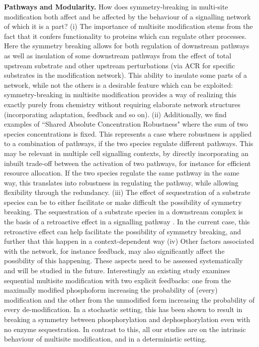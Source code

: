 \documentclass[9pt,lineno]{elife}
\begin{document}
{\bf Pathways and Modularity.} How does symmetry-breaking in multi-site modification both affect and be affected by the behaviour of a signalling network of which it is a part? (i) The importance of multisite modification stems from the fact that it confers functionality to proteins which can regulate other processes. Here the symmetry breaking allows for both regulation of downstream pathways as well as insulation of some downstream pathways from the effect of total upstream substrate and other upstream perturbations (via ACR for specific substrates in the modification network). This ability to insulate some parts of a network, while not the others is a desirable feature which can be exploited: symmetry-breaking in multisite modification provides a way of realizing this exactly purely from chemistry without requiring elaborate network structures (incorporating adaptation, feedback and so on). 
(ii) Additionally, we find examples of ``Shared Absolute Concentration Robustness" where the sum of two species concentrations is fixed. This represents a case where robustness is applied to a combination of pathways, if the two species regulate different pathways. This may be relevant in multiple cell signalling contexts, by directly incorporating an inbuilt trade-off between the activation of two pathways, for instance for efficient resource allocation. If the two species regulate the same pathway in the same way, this translates into robustness in regulating the pathway, while allowing flexibility through the redundancy. 
(iii) The effect of sequestration of a substrate species can be to either facilitate or make difficult the possibility of symmetry breaking. The sequestration of a substrate species in a downstream complex is the basis of a retroactive effect in a signalling pathway \cite{Ventura2010, DelVecchio2008}. In the current case, this retroactive effect can help facilitate the possibility of symmetry breaking, and further that this happen in a context-dependent way  
(iv) Other factors associated with the network, for instance feedback, may also significantly affect the possibility of this happening. These aspects need to be assessed systematically and will be studied in the future. Interestingly an existing study \cite{Krishnamurthy2007a} examines sequential multisite modification with two  explicit feedbacks: one from the maximally modified phosphoform increasing the probability of (every) modification and the other from the unmodified form increasing the probability of every de-modification. In a stochastic setting, this has been shown to result in breaking a symmetry between phosphorylation and dephosphorylation even with no enzyme sequestration. In contrast to this, all our studies are on the intrinsic behaviour of multisite modification, and in a deterministic setting.
\end{document}
